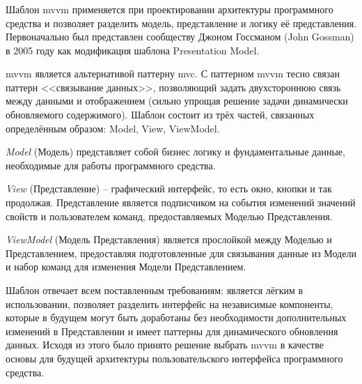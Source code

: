 \subsubsection {}
\label{sec:analysis:research:mobArch:mvvm}

Шаблон \gls{mvvm} применяется при проектировании архитектуры программного средства и позволяет разделить модель, представление и логику её представления. Первоначально был представлен сообществу Джоном Госсманом (John Gossman) в 2005 году как модификация шаблона Presentation Model\cite{wiki:mvvm}.

\gls{mvvm} является альтернативой паттерну \gls{mvc}. С паттерном \gls{mvvm} тесно связан паттерн <<связывание данных>>, позволяющий задать двухстороннюю связь между данными и отображением (сильно упрощая решение задачи динамически обновляемого содержимого). Шаблон состоит из трёх частей, связанных определённым образом: Model, View, ViewModel.

\emph{Model} (Модель) представляет собой бизнес логику и фундаментальные данные, необходимые для работы программного средства.

\emph{View} (Представление) -- графический интерфейс, то есть окно, кнопки и так продолжая. Представление является подписчиком на события изменений значений свойств и пользователем команд, предоставляемых Моделью Представления.

\emph{ViewModel} (Модель Представления) является прослойкой между Моделью и Представлением, предоставляя подготовленные для связывания данные из Модели и набор команд для изменения Модели Представлением.

Шаблон отвечает всем поставленным требованиям: является лёгким в использовании, позволяет разделить интерфейс на независимые компоненты, которые в будущем могут быть доработаны без необходимости дополнительных изменений в Представлении и имеет паттерны для динамического обновления данных\cite{app-architecture}. Исходя из этого было принято решение выбрать \gls{mvvm} в качестве основы для будущей архитектуры пользовательского интерфейса программного средства.